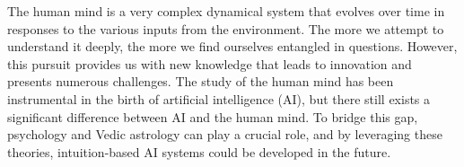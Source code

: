 The human mind is a very complex dynamical system that evolves over time in responses to the various inputs from the environment. The more we attempt to understand it deeply, the more we find ourselves entangled in questions. However, this pursuit provides us with new knowledge that leads to innovation and presents numerous challenges. The study of the human mind has been instrumental in the birth of artificial intelligence (AI), but there still exists a significant difference between AI and the human mind. To bridge this gap, psychology and Vedic astrology can play a crucial role, and by leveraging these theories, intuition-based AI systems could be developed in the future.